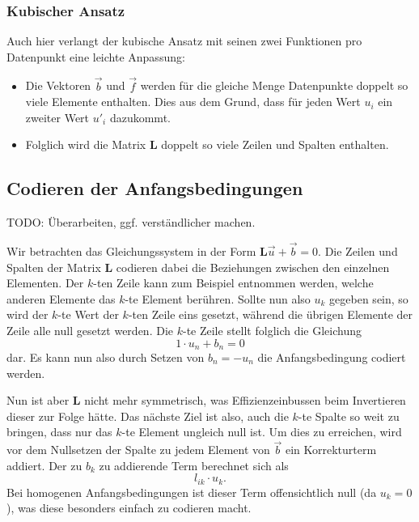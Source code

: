 \subsubsection{Kubischer Ansatz}
Auch hier verlangt der kubische Ansatz mit seinen zwei Funktionen pro Datenpunkt eine leichte Anpassung: 
\begin{itemize}
    \item Die Vektoren $\vec{b}$ und $\vec{f}$ werden für die gleiche Menge Datenpunkte doppelt so viele Elemente enthalten.
          Dies aus dem Grund, dass für jeden Wert $u_i$ ein zweiter Wert $u'_i$ dazukommt.
    \item Folglich wird die Matrix $\mathbf{L}$ doppelt so viele Zeilen und Spalten enthalten. 
\end{itemize}


\subsection{Codieren der Anfangsbedingungen\label{fem:1d:anfangsbedingungen}}
TODO: Überarbeiten, ggf. verständlicher machen.

Wir betrachten das Gleichungssystem in der Form $\mathbf{L}\vec{u} + \vec{b} = 0$. 
Die Zeilen und Spalten der Matrix $\mathbf{L}$ codieren dabei die Beziehungen zwischen den einzelnen Elementen.
Der $k$-ten Zeile kann zum Beispiel entnommen werden, welche anderen Elemente das $k$-te Element berühren. 
Sollte nun also $u_k$ gegeben sein, so wird der $k$-te Wert der $k$-ten Zeile eins gesetzt, während die übrigen Elemente der Zeile alle null gesetzt werden.
Die $k$-te Zeile stellt folglich die Gleichung 
\begin{equation}
    1 \cdot u_n + b_n = 0
\end{equation}
dar. 
Es kann nun also durch Setzen von $b_n = -u_n$ die Anfangsbedingung codiert werden.

Nun ist aber $\mathbf{L}$ nicht mehr symmetrisch, was Effizienzeinbussen beim Invertieren dieser zur Folge hätte.
Das nächste Ziel ist also, auch die $k$-te Spalte so weit zu bringen, dass nur das $k$-te Element ungleich null ist.
Um dies zu erreichen, wird vor dem Nullsetzen der Spalte zu jedem Element von $\vec{b}$ ein Korrekturterm addiert.
Der zu $b_k$ zu addierende Term berechnet sich als
\begin{equation}
    l_{ik} \cdot u_k.
\end{equation}
Bei homogenen Anfangsbedingungen ist dieser Term offensichtlich null (da $u_k = 0$), was diese besonders einfach zu codieren macht.


